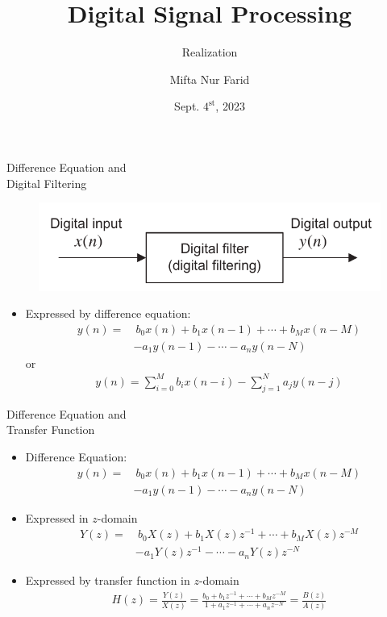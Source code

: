 \documentclass[pdflatex,compress,mathserif]{beamer}
\title{Digital Signal Processing}
\subtitle{Realization}
\author{Mifta Nur Farid}
\date{Sept. $\text{4}^\text{st}$, 2023}
\begin{document}
\maketitle

\begin{frame}{Difference Equation and\\Digital Filtering}
	\begin{figure}
		\includegraphics[width=0.7\linewidth]{./img/img01.png}
	\end{figure}
	\begin{itemize}
		\item Expressed by difference equation:
		\begin{align*}
			y(n) = &~ b_0 x(n) + b_1 x(n-1) + \cdots +b_Mx(n-M)\\
				   & -a_1y(n-1) - \cdots - a_ny(n-N)
		\end{align*}
		or
		\begin{align*}
			y(n) = \sum_{i=0}^{M} b_i x(n-i) - \sum_{j=1}^{N} a_j y(n-j)
		\end{align*}
	\end{itemize}
\end{frame}

\begin{frame}{Difference Equation and\\Transfer Function}
	\begin{itemize}
		\item Difference Equation:
		\begin{align*}
			y(n) = &~ b_0 x(n) + b_1 x(n-1) + \cdots +b_Mx(n-M)\\
				   & -a_1y(n-1) - \cdots - a_ny(n-N)
		\end{align*}
		\item Expressed in $z$-domain
		\begin{align*}
			Y(z) = &~ b_0 X(z) + b_1 X(z)z^{-1} + \cdots + b_M X(z)z^{-M}\\
				   & -a_1Y(z)z^{-1} - \cdots - a_n Y(z)z^{-N}
		\end{align*}
		\item Expressed by transfer function in $z$-domain
		\begin{align*}
			H(z) = \frac{Y(z)}{X(z)} = \frac{b_0 + b_1z^{-1} + \cdots + b_M z^{-M}}{1 + a_1z^{-1} + \cdots + a_n z^{-N}} = \frac{B(z)}{A(z)}
		\end{align*}
	\end{itemize}
\end{frame}
\end{document}
